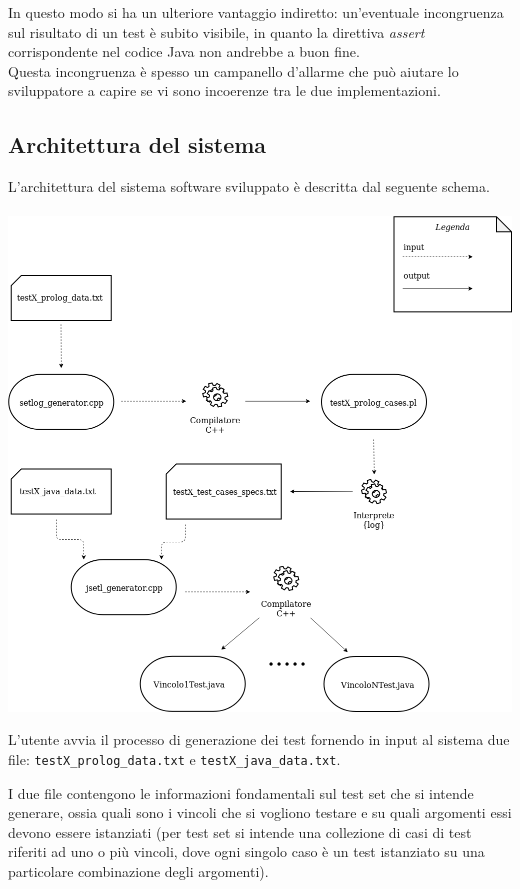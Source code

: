 \documentclass{article}
\begin{document}
\clearpage

In questo modo si ha un ulteriore vantaggio indiretto: un'eventuale incongruenza sul risultato di un test è subito visibile, in quanto la direttiva \emph{assert} corrispondente nel codice Java non andrebbe a buon fine.\\
Questa incongruenza è spesso un campanello d'allarme che può aiutare lo sviluppatore a capire se vi sono incoerenze tra le due implementazioni.\\

\clearpage

\subsection{Architettura del sistema}
L'architettura del sistema software sviluppato è descritta dal seguente schema.\\\\ 


\includegraphics[scale=0.4]{images/architecture.png}
    

\clearpage

L'utente avvia il processo di generazione dei test fornendo in input al sistema due file: \texttt{testX\_prolog\_data.txt} e \texttt{testX\_java\_data.txt}.

I due file contengono le informazioni fondamentali sul test set che si intende generare, ossia quali sono i vincoli che si vogliono testare e su quali argomenti essi devono essere istanziati (per test set si intende una collezione di casi di test riferiti ad uno o più vincoli, dove ogni singolo caso è un test istanziato su una particolare combinazione degli argomenti).\\
\end{document}
